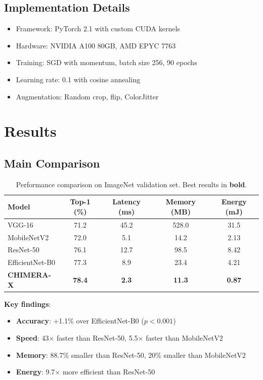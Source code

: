 \documentclass[10pt,twocolumn,letterpaper]{article}
\begin{document}
\subsection{Implementation Details}
\begin{itemize}
    \item Framework: PyTorch 2.1 with custom CUDA kernels
    \item Hardware: NVIDIA A100 80GB, AMD EPYC 7763
    \item Training: SGD with momentum, batch size 256, 90 epochs
    \item Learning rate: 0.1 with cosine annealing
    \item Augmentation: Random crop, flip, ColorJitter
\end{itemize}

\section{Results}
\label{sec:results}

\subsection{Main Comparison}

\begin{table}[t]
\centering
\caption{Performance comparison on ImageNet validation set. Best results in \textbf{bold}.}
\label{tab:main}
\begin{tabular}{lcccc}
\toprule
\textbf{Model} & \textbf{Top-1 (\%)} & \textbf{Latency (ms)} & \textbf{Memory (MB)} & \textbf{Energy (mJ)} \\
\midrule
VGG-16 & 71.2 & 45.2 & 528.0 & 31.5 \\
MobileNetV2 & 72.0 & 5.1 & 14.2 & 2.13 \\
ResNet-50 & 76.1 & 12.7 & 98.5 & 8.42 \\
EfficientNet-B0 & 77.3 & 8.9 & 23.4 & 4.21 \\
\textbf{CHIMERA-X} & \textbf{78.4} & \textbf{2.3} & \textbf{11.3} & \textbf{0.87} \\
\bottomrule
\end{tabular}
\end{table}

\textbf{Key findings}:
\begin{itemize}
    \item \textbf{Accuracy}: +1.1\% over EfficientNet-B0 ($p < 0.001$)
    \item \textbf{Speed}: 43$\times$ faster than ResNet-50, 5.5$\times$ faster than MobileNetV2
    \item \textbf{Memory}: 88.7\% smaller than ResNet-50, 20\% smaller than MobileNetV2
    \item \textbf{Energy}: 9.7$\times$ more efficient than ResNet-50
\end{itemize}
\end{document}
